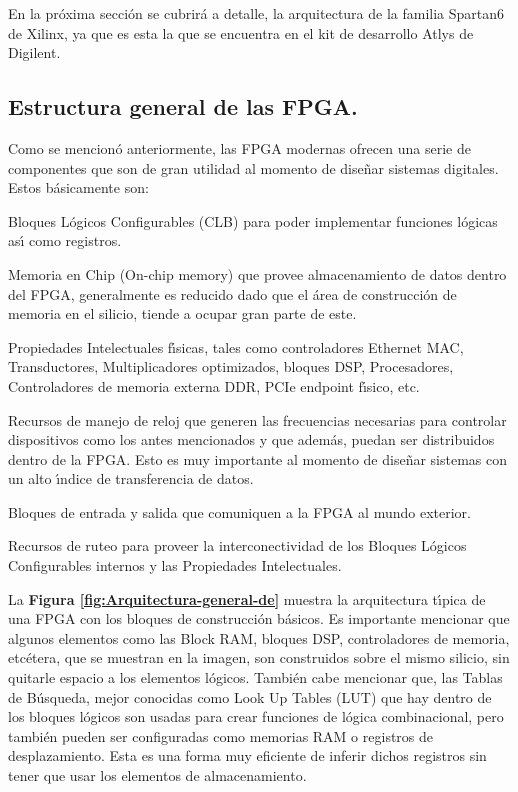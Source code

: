 En la pr\'{o}xima secci\'{o}n se cubrir\'{a} a detalle, la arquitectura
de la familia Spartan6 de Xilinx, ya que es esta la que se encuentra
en el kit de desarrollo Atlys de Digilent.

\subsection{Estructura general de las FPGA.}

Como se mencion\'{o} anteriormente, las FPGA modernas ofrecen una
serie de componentes que son de gran utilidad al momento de dise\~{n}ar
sistemas digitales. Estos b\'{a}sicamente son:
\begin{itemize}
\begin{doublespace}
\item Bloques L\'{o}gicos Configurables (CLB) para poder implementar funciones
l\'{o}gicas as\'{\i} como registros.
\item Memoria en Chip (On-chip memory) que provee almacenamiento de datos
dentro del FPGA, generalmente es reducido dado que el \'{a}rea de
construcci\'{o}n de memoria en el silicio, tiende a ocupar gran parte
de este.
\item Propiedades Intelectuales f\'{\i}sicas, tales como controladores Ethernet
MAC, Transductores, Multiplicadores optimizados, bloques DSP, Procesadores,
Controladores de memoria externa DDR, PCIe endpoint f\'{\i}sico, etc.
\item Recursos de manejo de reloj que generen las frecuencias necesarias
para controlar dispositivos como los antes mencionados y que adem\'{a}s,
puedan ser distribuidos dentro de la FPGA. Esto es muy importante
al momento de dise\~{n}ar sistemas con un alto \'{\i}ndice de transferencia
de datos.
\item Bloques de entrada y salida que comuniquen a la FPGA al mundo exterior.
\item Recursos de ruteo para proveer la interconectividad de los Bloques
L\'{o}gicos Configurables internos y las Propiedades Intelectuales.
\end{doublespace}
\end{itemize}
La \textbf{Figura \ref{fig:Arquitectura-general-de}} muestra la arquitectura
t\'{\i}pica de una FPGA con los bloques de construcci\'{o}n b\'{a}sicos.
Es importante mencionar que algunos elementos como las Block RAM,
bloques DSP, controladores de memoria, etc\'{e}tera, que se muestran
en la imagen, son construidos sobre el mismo silicio, sin quitarle
espacio a los elementos l\'{o}gicos. Tambi\'{e}n cabe mencionar que,
las Tablas de B\'{u}squeda, mejor conocidas como Look Up Tables (LUT)
que hay dentro de los bloques l\'{o}gicos son usadas para crear funciones
de l\'{o}gica combinacional, pero tambi\'{e}n pueden ser configuradas
como memorias RAM o registros de desplazamiento. Esta es una forma
muy eficiente de inferir dichos registros sin tener que usar los elementos
de almacenamiento.

